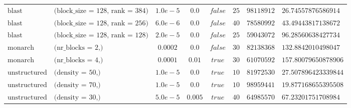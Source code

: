 \begin{sidewaystable}[h!]
\begin{tabular}{llcccrrl}
$\text{blast}$ & $\text{(block\_size = 128, rank = 384)}$ & $1.0e-5$ & $0.0$ & $false$ & $25$ & $98118912$ & $26.74557876586914$\\
$\text{blast}$ & $\text{(block\_size = 128, rank = 256)}$ & $6.0e-6$ & $0.0$ & $false$ & $40$ & $78580992$ & $43.49443817138672$\\
$\text{blast}$ & $\text{(block\_size = 128, rank = 128)}$ & $2.0e-5$ & $0.0$ & $false$ & $25$ & $59043072$ & $96.28560638427734$\\
$\text{monarch}$ & $\text{(nr\_blocks = 2,)}$ & $0.0002$ & $0.0$ & $false$ & $30$ & $82138368$ & $132.8842010498047$\\
$\text{monarch}$ & $\text{(nr\_blocks = 4,)}$ & $0.0001$ & $0.01$ & $true$ & $30$ & $61070592$ & $157.80079650878906$\\
$\text{unstructured}$ & $\text{(density = 50,)}$ & $1.0e-5$ & $0.0$ & $true$ & $10$ & $81972530$ & $27.507896423339844$\\
$\text{unstructured}$ & $\text{(density = 70,)}$ & $1.0e-5$ & $0.0$ & $true$ & $10$ & $98959441$ & $19.877168655395508$\\
$\text{unstructured}$ & $\text{(density = 30,)}$ & $5.0e-5$ & $0.005$ & $true$ & $40$ & $64985570$ & $67.23201751708984$\\
\end{tabular}

\end{sidewaystable}
